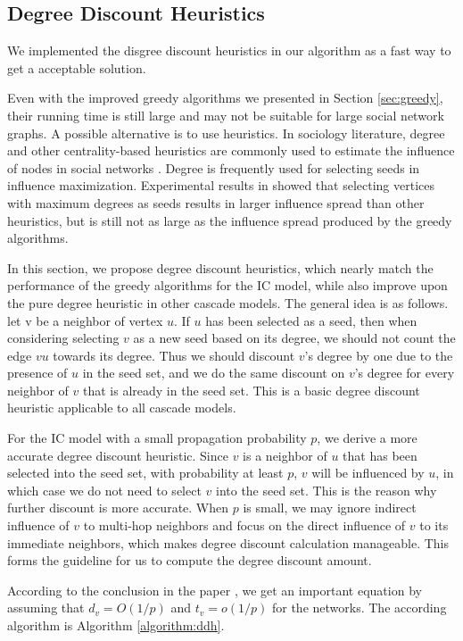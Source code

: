 \documentclass[journal,twoside,web]{ieeecolor}
\begin{document}
\subsection{Degree Discount Heuristics}
We implemented the disgree discount heuristics in our algorithm as a fast way to get a acceptable solution.\par
Even with the improved greedy algorithms we presented in Section \ref{sec:greedy}, their running time is still large and may not be suitable for large social network graphs. A possible alternative is to use heuristics. In sociology literature, degree and other centrality-based heuristics are commonly used to estimate the influence of nodes in social networks \cite{Wasserman1994}. Degree is frequently used for selecting seeds in influence maximization. Experimental results in \cite{Kempe2003} showed that selecting vertices with maximum degrees as seeds results in larger influence spread than other heuristics, but is still not as large as the influence spread
produced by the greedy algorithms. \par
In this section, we propose degree discount heuristics, which nearly match the performance of the greedy algorithms for the IC model, while also improve upon the pure degree heuristic in other cascade models. The general idea is as follows. let v be a neighbor of vertex $u$. If $u$ has been selected as a seed, then when considering selecting $v$ as a new seed based on its degree, we should not count the edge $vu$ towards its degree. Thus we should discount $v$’s degree by one due to the presence of $u$ in the seed set, and we do the same discount on $v$’s degree for every neighbor of $v$ that is already in the seed set. This is a basic degree discount heuristic applicable to all cascade models.\par
For the IC model with a small propagation probability $p$, we derive a more accurate degree discount heuristic. Since $v$ is a neighbor of $u$ that has been selected into the seed set, with probability at least $p$, $v$ will be influenced by $u$, in which case we do not need to select $v$ into the seed set. This is the reason why further discount is more accurate. When $p$ is small, we may ignore indirect influence of $v$ to multi-hop neighbors and focus on the direct influence of $v$ to its immediate neighbors, which makes degree discount calculation manageable. This forms the guideline for us to compute the degree discount amount.\par
According to the conclusion in the paper \cite{Chen2009}, we get an important equation by assuming that $d_v=O(1/p)$ and $t_v=o(1/p)$ for the networks. The according algorithm is Algorithm \ref{algorithm:ddh}.
\end{document}

